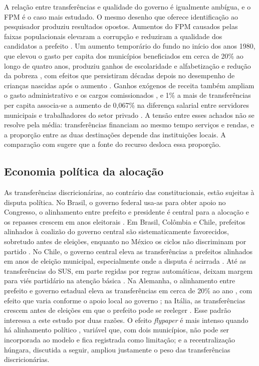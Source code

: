A relação entre transferências e qualidade do governo é igualmente ambígua, e o FPM é o caso mais estudado. O mesmo desenho que oferece identificação ao pesquisador produziu resultados opostos. Aumentos do FPM causados pelas faixas populacionais elevaram a corrupção e reduziram a qualidade dos candidatos a prefeito \citep{Brollo2013}. Um aumento temporário do fundo no início dos anos 1980, que elevou o gasto per capita dos municípios beneficiados em cerca de 20\% ao longo de quatro anos, produziu ganhos de escolaridade e alfabetização e redução da pobreza \citep{Litschig2013206, deCarvalhoFilho20201}, com efeitos que persistiram décadas depois no desempenho de crianças nascidas após o aumento \citep{deCarvalhoFilho20201}. Ganhos exógenos de receita também ampliam o gasto administrativo e os cargos comissionados \citep{Alves2024}, e 1\% a mais de transferências per capita associa-se a aumento de 0,067\% na diferença salarial entre servidores municipais e trabalhadores do setor privado \citep{SousaMonte2023}. A tensão entre esses achados não se resolve pela média: transferências financiam ao mesmo tempo serviços e rendas, e a proporção entre as duas destinações depende das instituições locais. A comparação com \citet{Gadenne2017} sugere que a fonte do recurso desloca essa proporção.

\subsection{Economia política da alocação}\label{sec:politica}

As transferências discricionárias, ao contrário das constitucionais, estão sujeitas à disputa política. No Brasil, o governo federal usa-as para obter apoio no Congresso, o alinhamento entre prefeito e presidente é central para a alocação e os repasses crescem em anos eleitorais \citep{Ferreira202139}. Em Brasil, Colômbia e Chile, prefeitos alinhados à coalizão do governo central são sistematicamente favorecidos, sobretudo antes de eleições, enquanto no México os ciclos não discriminam por partido \citep{Gainza20211032}. No Chile, o governo central eleva as transferências a prefeitos alinhados em anos de eleição municipal, especialmente onde a disputa é acirrada \citep{Corvalan20181}. Até as transferências do SUS, em parte regidas por regras automáticas, deixam margem para viés partidário na atenção básica \citep{Orellano2022143}. Na Alemanha, o alinhamento entre prefeito e governo estadual eleva as transferências em cerca de 20\% ao ano \citep{Quinckhardt2023}, com efeito que varia conforme o apoio local ao governo \citep{Baskaran201775}; na Itália, as transferências crescem antes de eleições em que o prefeito pode se reeleger \citep{DalleNogare20171}. Esse padrão interessa a este estudo por duas razões. O efeito \textit{flypaper} é mais intenso quando há alinhamento político \citep{Ferreira2019203}, variável que, com dois municípios, não pode ser incorporada ao modelo e fica registrada como limitação; e a recentralização húngara, discutida a seguir, ampliou justamente o peso das transferências discricionárias.

